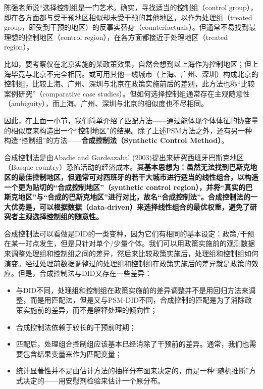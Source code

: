 \documentclass[cn,12pt,math=newtx,citestyle=gb7714-2015,bibstyle=gb7714-2015]{elegantbook}
\begin{document}
	陈强老师说“选择控制组是一门艺术。确实，寻找适当的控制组（control group），即在各方面都与受干预地区相似却未受干预的其他地区，以作为处理组（treated group，即受到干预的地区）的反事实替身（counterfactuals）。但通常不易找到最理想的控制地区（control region），在各方面都接近于处理地区（treated region）。
	
	比如，要考察仅在北京实施的某政策效果，自然会想到以上海作为控制地区；但上海毕竟与北京不完全相同。或可用其他一线城市（上海、广州、深圳）构成北京的控制组，比较上海、广州、深圳与北京在政策实施前后的差别，此方法也称“比较案例研究”（comparative case studies）。但如何选择控制组通常存在主观随意性（ambiguity），而上海、广州、深圳与北京的相似度也不尽相同。
	
	因此，在上面一小节，我们简单介绍了匹配方法——通过能体现个体体征的协变量的相似度来构造出一个“控制地区”的结果。除了上述PSM方法之外，还有另一种构造“控制组”的方法——\textbf{合成控制法（Synthetic Control Method）}。
	
	合成控制法是由Abadie and Gardeazabal (2003)提出来研究西班牙巴斯克地区（Basque country）恐怖活动的经济成本。\textbf{其基本思想为：虽然无法找到巴斯克地区的最佳控制地区，但通常可对西班牙的若干大城市进行适当的线性组合，以构造一个更为贴切的“合成控制地区”（synthetic control region），并将“真实的巴斯克地区”与“合成的巴斯克地区”进行对比，故名“合成控制法”。合成控制法的一大优势是，可以根据数据（data-driven）来选择线性组合的最优权重，避免了研究者主观选择控制组的随意性。}
	
	合成控制法可以看做是DID的一类变种，因为它们有相同的基本设定：政策/干预在某一时点发生，但是只针对单个/少量个体。我们可以用政策实施前的观测数据来调整处理组和控制组之间的差异，然后来比较政策实施后，处理组和控制组如何演变。经过处理前数据调整过的处理组和控制组在政策实施后的差异就是政策的效应。但是，合成控制法与DID又存在一些差异：
	
	\begin{itemize}
		\item 与DID不同，处理组和控制组在政策实施前的差异调整并不是用回归方法来调整，而是用匹配法，但是又与PSM-DID不同，合成控制的匹配是为了消除政策实施前的差异，而不是解释处理的倾向性；
		\item  合成控制法依赖于较长的干预前时期；
		\item 匹配后，处理组合控制组应该基本已经消除了干预前的差异。通常，我们也需要包含结果变量来作为匹配变量；
		\item 统计显著性并不是由估计方法的抽样分布图来决定的，而是一种“随机推断”方式决定的——用安慰剂检验来估计一个原分布。
	\end{itemize}
\end{document}

